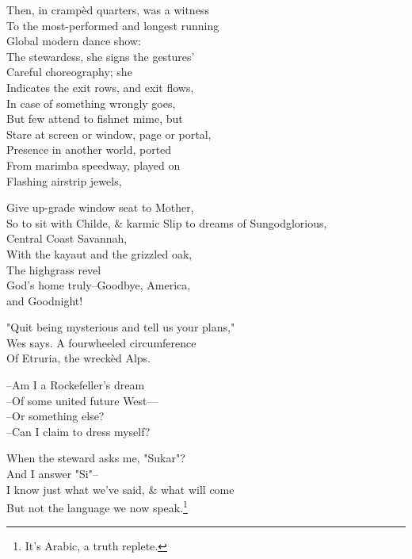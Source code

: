 Then, in crampèd quarters, was a witness \\
To the most-performed and longest running \\
Global modern dance show: \\
The stewardess, she signs the gestures' \\
Careful choreography; she \\
Indicates the exit rows, and exit flows, \\
In case of something wrongly goes, \\
But few attend to fishnet mime, but \\
Stare at screen or window, page or portal, \\
Presence in another world, ported \\
From marimba speedway, played on \\
Flashing airstrip jewels,

Give up-grade window seat to Mother, \\
So to sit with Childe, \& karmic
Slip to dreams of Sungodglorious, \\
Central Coast Savannah, \\
With the kayaut and the grizzled oak, \\
The highgrass revel \\
God's home truly--Goodbye, America, \\
and Goodnight!

"Quit being mysterious and tell us your plans," \\
Wes says. A fourwheeled circumference \\
Of Etruria, the wreckèd Alps.

--Am I a Rockefeller's dream \\
--Of some united future West— \\
--Or something else? \\
--Can I claim to dress myself?

When the steward asks me, "Sukar"? \\
And I answer "Si"-- \\
I know just what we've said, \& what will come \\
But not the language we now speak.\footnote{It's Arabic, a truth replete.}